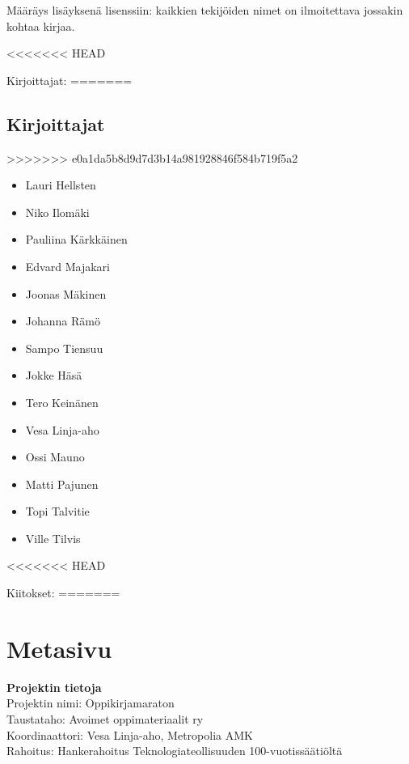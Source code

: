 Määräys lisäyksenä lisenssiin: kaikkien tekijöiden nimet on ilmoitettava jossakin kohtaa kirjaa.

<<<<<<< HEAD
\newpage

\begin{minipage}[t]{0.5\textwidth}
Kirjoittajat:
=======
\subsection*{Kirjoittajat}
\begin{minipage}[t]{0.5\textwidth}
>>>>>>> e0a1da5b8d9d7d3b14a981928846f584b719f5a2
\begin{itemize}
\item Lauri Hellsten
\item Niko Ilomäki
\item Pauliina Kärkkäinen
\item Edvard Majakari
\item Joonas Mäkinen
\item Johanna Rämö
\item Sampo Tiensuu
\end{itemize}
\end{minipage}
\begin{minipage}[t]{0.5\textwidth}
\begin{itemize}
\item Jokke Häsä
\item Tero Keinänen
\item Vesa Linja-aho
\item Ossi Mauno
\item Matti Pajunen
\item Topi Talvitie
\item Ville Tilvis
\end{itemize}
\end{minipage}
<<<<<<< HEAD
\begin{minipage}[t]{0.5\textwidth}
Kiitokset:
=======

\newpage
\section*{Metasivu}

\textbf{Projektin tietoja} \\
Projektin nimi: Oppikirjamaraton \\
Taustataho: Avoimet oppimateriaalit ry \\
Koordinaattori: Vesa Linja-aho, Metropolia AMK \\
Rahoitus: Hankerahoitus Teknologiateollisuuden 100-vuotissäätiöltä


\end{minipage}
\end{minipage}
